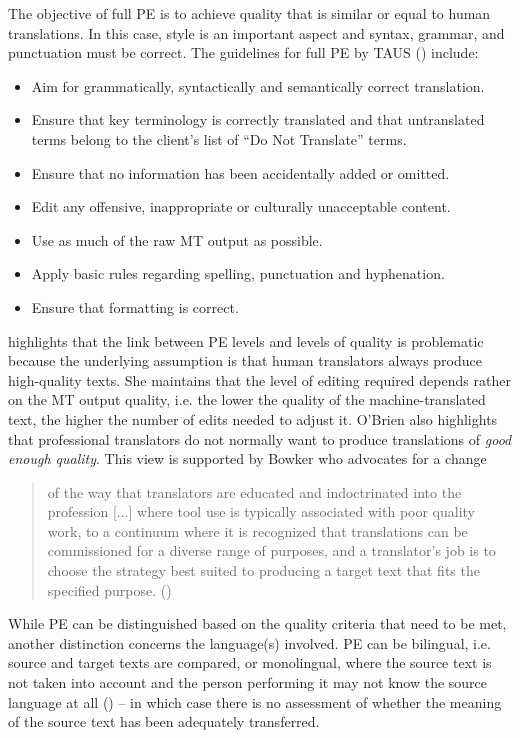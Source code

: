 The objective of full PE is to achieve quality that is similar or equal to human translations. In this case, style is an important aspect and syntax, grammar, and punctuation must be correct. The guidelines for full PE by TAUS (\cite{massardo2016mt}) include:
\begin{itemize}
\setlength\itemsep{-0.5em}

    \item Aim for grammatically, syntactically and semantically correct translation.
    \item Ensure that key terminology is correctly translated and that untranslated terms belong to the client's list of ``Do Not Translate'' terms.
    \item Ensure that no information has been accidentally added or omitted.
    \item Edit any offensive, inappropriate or culturally unacceptable content.
    \item Use as much of the raw MT output as possible.
    \item Apply basic rules regarding spelling, punctuation and hyphenation.
    \item Ensure that formatting is correct.
\end{itemize}

\textcite[110f]{o2022deal} highlights that the link between PE levels and levels of quality is problematic because the underlying assumption is that human translators always produce high-quality texts. She maintains that the level of editing required depends rather on the MT output quality, i.e. the lower the quality of the machine-translated text, the higher the number of edits needed to adjust it. O'Brien also highlights that professional translators do not normally want to produce translations of \textit{good enough quality}. This view is supported by Bowker who advocates for a change
\begin{quote}
   of the way that translators are educated and indoctrinated into the profession [...] where tool use is typically associated with poor quality work, to a continuum where it is recognized that translations can be commissioned for a diverse range of purposes, and a translator’s job is to choose the strategy best suited to producing a target text that fits the specified purpose. (\cite[454]{bowker2019fit})
\end{quote}

While PE can be distinguished based on the quality criteria that need to be met, another distinction concerns the language(s) involved. PE can be bilingual, i.e. source and target texts are compared, or monolingual, where the source text is not taken into account and the person performing it may not know the source language at all (\cite[32]{nitzke2021short}) -- in which case there is no assessment of whether the meaning of the source text has been adequately transferred.

